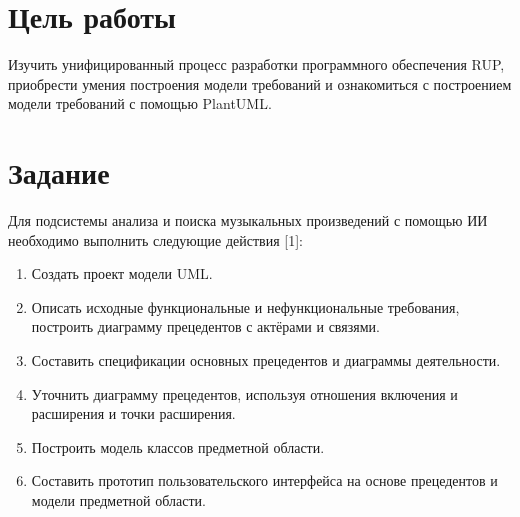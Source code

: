 \section{Цель работы}

Изучить унифицированный процесс разработки программного обеспечения RUP,
приобрести умения построения модели требований и ознакомиться с построением
модели требований с помощью PlantUML.

\section{Задание}

Для подсистемы анализа и поиска музыкальных произведений с помощью ИИ
необходимо выполнить следующие действия [1]:
\begin{enumerate}
  \item Создать проект модели UML.
  \item Описать исходные функциональные и нефункциональные требования,
  построить диаграмму прецедентов с актёрами и связями.
  \item Составить спецификации основных прецедентов и диаграммы деятельности.
  \item Уточнить диаграмму прецедентов, используя отношения включения
  и расширения и точки расширения.
  \item Построить модель классов предметной области.
  \item Составить прототип пользовательского интерфейса на основе
  прецедентов и модели предметной области.
\end{enumerate}
